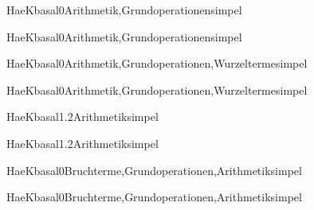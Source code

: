 \documentclass[12pt]{article}
\begin{document}
\begin{Add}{HaeK}{basal0}{Arithmetik,Grundoperationen}{simpel}
\solution{ }
\end{Add}
\begin{Add}{HaeK}{basal0}{Arithmetik,Grundoperationen}{simpel}
\end{Add}

\begin{Add}{HaeK}{basal0}{Arithmetik,Grundoperationen,Wurzelterme}{simpel}
\solution{ }
\end{Add}
\begin{Add}{HaeK}{basal0}{Arithmetik,Grundoperationen,Wurzelterme}{simpel}
\end{Add}

\begin{Add}{HaeK}{basal1.2}{Arithmetik}{simpel}
\solution{ }
\end{Add}
\begin{Add}{HaeK}{basal1.2}{Arithmetik}{simpel}
\end{Add}

            \begin{Add}{HaeK}{basal0}{Bruchterme,Grundoperationen,Arithmetik}{simpel}
            \solution{ }
            \end{Add}
            \begin{Add}{HaeK}{basal0}{Bruchterme,Grundoperationen,Arithmetik}{simpel}
            \end{Add}
            
\end{document}
